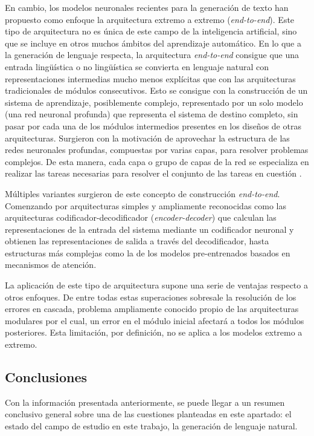 En cambio, los modelos neuronales recientes para la generación de texto han propuesto como enfoque la arquitectura extremo a extremo (\textit{end-to-end}). Este tipo de arquitectura no es única de este campo de la inteligencia artificial, sino que se incluye en otros muchos ámbitos del aprendizaje automático. En lo que a la generación de lenguaje respecta, la arquitectura \textit{end-to-end} consigue que una entrada lingüística o no lingüística se convierta en lenguaje natural con representaciones intermedias mucho menos explícitas que con las arquitecturas tradicionales de módulos consecutivos. Esto se consigue con la construcción de un sistema de aprendizaje, posiblemente complejo, representado por un solo modelo (una red neuronal profunda) que representa el sistema de destino completo, sin pasar por cada una de los módulos intermedios presentes en los diseños de otras arquitecturas. Surgieron con la motivación de aprovechar la estructura de las redes neuronales profundas, compuestas por varias capas, para resolver problemas complejos. De esta manera, cada capa o grupo de capas de la red se especializa en realizar las tareas necesarias para resolver el conjunto de las tareas en cuestión \citep{Ferreira2019NeuralDG}. 

Múltiples variantes surgieron de este concepto de construcción \textit{end-to-end}. Comenzando por arquitecturas simples y ampliamente reconocidas como las arquitecturas codificador-decodificador (\textit{encoder-decoder}) que calculan las representaciones de la entrada del sistema mediante un codificador neuronal y obtienen las representaciones de salida a través del decodificador, hasta estructuras más complejas como la de los modelos pre-entrenados basados en mecanismos de atención.


La aplicación de este tipo de arquitectura supone una serie de ventajas respecto a otros enfoques. De entre todas estas superaciones sobresale la resolución de los errores en cascada, problema ampliamente conocido propio de las arquitecturas modulares por el cual, un error en el módulo inicial afectará a todos los módulos posteriores. Esta limitación, por definición, no se aplica a los modelos extremo a extremo.



\subsection{Conclusiones}

Con la información presentada anteriormente, se puede llegar a un resumen conclusivo general sobre una de las cuestiones planteadas en este apartado: el estado del campo de estudio en este trabajo, la generación de lenguaje natural.

